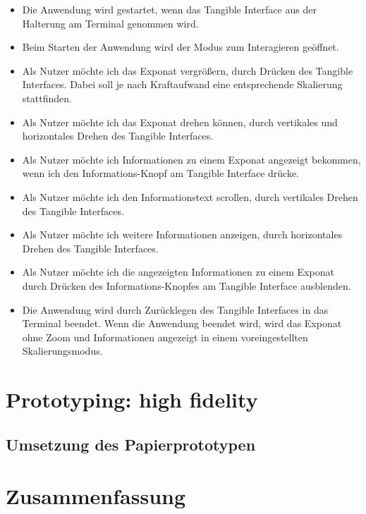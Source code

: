 \documentclass[runningheads,a4paper]{llncs}
\begin{document}
\begin{itemize}
	\item Die Anwendung wird gestartet, wenn das Tangible Interface aus der Halterung am Terminal genommen wird.
	\item Beim Starten der Anwendung wird der Modus zum Interagieren geöffnet.
	\item Als Nutzer möchte ich das Exponat vergrößern, durch  Drücken des Tangible Interfaces. Dabei soll je nach Kraftaufwand eine entsprechende Skalierung stattfinden. 
	\item Als Nutzer möchte ich das Exponat drehen können, durch vertikales und horizontales Drehen des Tangible Interfaces.
	\item Als Nutzer möchte ich Informationen zu einem Exponat angezeigt bekommen, wenn ich den Informations-Knopf am Tangible Interface drücke.
	\item Als Nutzer möchte ich den Informationstext scrollen, durch vertikales Drehen des Tangible Interfaces.
	\item Als Nutzer möchte ich weitere Informationen anzeigen, durch horizontales Drehen des Tangible Interfaces.
	\item Als Nutzer möchte ich die angezeigten Informationen zu einem Exponat durch Drücken des Informations-Knopfes am Tangible Interface ausblenden.
	\item Die Anwendung wird durch Zurücklegen des Tangible Interfaces in das Terminal beendet.
	Wenn die Anwendung beendet wird, wird das Exponat ohne Zoom und Informationen angezeigt in einem voreingestellten Skalierungsmodus.
	
\end{itemize}

\section{Prototyping: high fidelity}
\subsection{Umsetzung des Papierprototypen}

\section{Zusammenfassung}


\newpage
 

\end{document}
